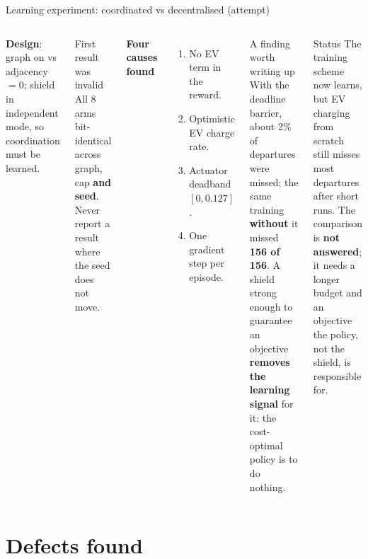 \documentclass[aspectratio=169,10pt]{beamer}
\begin{document}
\begin{frame}{Learning experiment: coordinated vs decentralised (attempt)}
\begin{columns}[T]
\textbf{Design}: graph on vs adjacency $= 0$; shield in independent mode, so coordination must be learned.\\[4pt]
\begin{alertblock}{First result was invalid}
All 8 arms bit-identical across graph, cap \textbf{and seed}. Never report a result where the seed does not move.
\end{alertblock}
\textbf{Four causes found}
\begin{enumerate}
  \item No EV term in the reward.
  \item Optimistic EV charge rate.
  \item Actuator deadband $[0, 0.127]$.
  \item One gradient step per episode.
\end{enumerate}
\begin{exampleblock}{A finding worth writing up}
With the deadline barrier, about 2\% of departures were missed; the same training \textbf{without} it missed \textbf{156 of 156}. A shield strong enough to guarantee an objective \textbf{removes the learning signal} for it: the cost-optimal policy is to do nothing.
\end{exampleblock}
\begin{alertblock}{Status}
The training scheme now learns, but EV charging from scratch still misses most departures after short runs. The comparison is \textbf{not answered}; it needs a longer budget and an objective the policy, not the shield, is responsible for.
\end{alertblock}
\end{columns}
\end{frame}

\section{Defects found}
\end{document}
